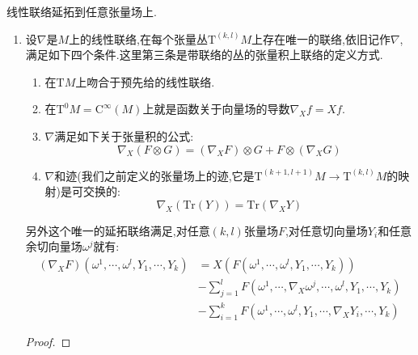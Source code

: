 线性联络延拓到任意张量场上.
\begin{enumerate}
	\item 设$\nabla$是$M$上的线性联络,在每个张量丛$\mathrm{T}^{(k,l)}M$上存在唯一的联络,依旧记作$\nabla$,满足如下四个条件.这里第三条是带联络的丛的张量积上联络的定义方式.
	\begin{enumerate}
		\item 在$\mathrm{T}M$上吻合于预先给的线性联络.
		\item 在$\mathrm{T}^0M=\mathrm{C}^{\infty}(M)$上就是函数关于向量场的导数$\nabla_Xf=Xf$.
		\item $\nabla$满足如下关于张量积的公式:
		$$\nabla_X(F\otimes G)=(\nabla_XF)\otimes G+F\otimes(\nabla_XG)$$
		\item $\nabla$和迹(我们之前定义的张量场上的迹,它是$\mathrm{T}^{(k+1,l+1)}M\to\mathrm{T}^{(k,l)}M$的映射)是可交换的:
		$$\nabla_X(\mathrm{Tr}(Y))=\mathrm{Tr}(\nabla_XY)$$
	\end{enumerate}

    另外这个唯一的延拓联络满足,对任意$(k,l)$张量场$F$,对任意切向量场$Y_i$和任意余切向量场$\omega^j$就有:
    \begin{align*}
    	(\nabla_XF)(\omega^1,\cdots,\omega^l,Y_1,\cdots,Y_k)&=X(F(\omega^1,\cdots,\omega^l,Y_1,\cdots,Y_k))\\&-\sum_{j=1}^lF(\omega^1,\cdots,\nabla_X\omega^j,\cdots,\omega^l,Y_1,\cdots,Y_k)\\&-\sum_{i=1}^kF(\omega^1,\cdots,\omega^l,Y_1,\cdots,\nabla_XY_i,\cdots,Y_k)
    \end{align*}
    \begin{proof}
    	

\end{proof}
\end{enumerate}
